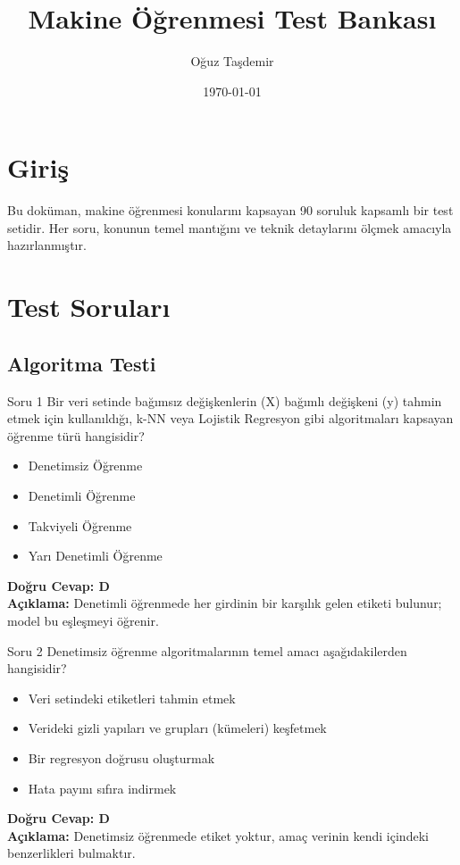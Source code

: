 \documentclass[12pt,a4paper]{article}
\title{\textbf{Makine Öğrenmesi Test Bankası}}
\author{Oğuz Taşdemir}
\date{\today}
\begin{document}
\maketitle
\newpage

\tableofcontents
\newpage

\section{Giriş}
Bu doküman, makine öğrenmesi konularını kapsayan 90 soruluk kapsamlı bir test setidir. Her soru, konunun temel mantığını ve teknik detaylarını ölçmek amacıyla hazırlanmıştır.

\newpage
\section{Test Soruları}

\subsection{Algoritma Testi}

\begin{testcard}{Soru 1}
    Bir veri setinde bağımsız değişkenlerin (X) bağımlı değişkeni (y) tahmin etmek için kullanıldığı, k-NN veya Lojistik Regresyon gibi algoritmaları kapsayan öğrenme türü hangisidir?
    \begin{itemize}
        \item[A)] Denetimsiz Öğrenme
        \item[B)] Denetimli Öğrenme
        \item[C)] Takviyeli Öğrenme
        \item[D)] Yarı Denetimli Öğrenme
    \end{itemize}
    \tcblower
    \textbf{Doğru Cevap: D} \\
    \textbf{Açıklama:} Denetimli öğrenmede her girdinin bir karşılık gelen etiketi bulunur; model bu eşleşmeyi öğrenir.
\end{testcard}

\begin{testcard}{Soru 2}
    Denetimsiz öğrenme algoritmalarının temel amacı aşağıdakilerden hangisidir?
    \begin{itemize}
        \item[A)] Veri setindeki etiketleri tahmin etmek
        \item[B)] Verideki gizli yapıları ve grupları (kümeleri) keşfetmek
        \item[C)] Bir regresyon doğrusu oluşturmak
        \item[D)] Hata payını sıfıra indirmek
    \end{itemize}
    \tcblower
    \textbf{Doğru Cevap: D} \\
    \textbf{Açıklama:} Denetimsiz öğrenmede etiket yoktur, amaç verinin kendi içindeki benzerlikleri bulmaktır.
\end{testcard}
\end{document}
